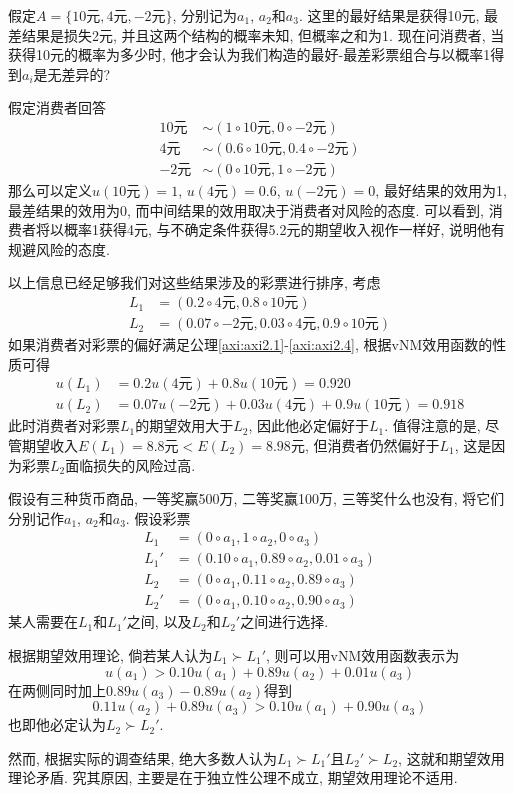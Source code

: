 \documentclass[cn, 12pt, math=mtpro2, bibstyle=apa, blue]{elegantbook}
\begin{document}
\begin{example}\label{exp:exp2.1}
假定$A=\{10\text{元},4\text{元},-2\text{元}\}$, 分别记为$a_1$, $a_2$和$a_3$. 这里的最好结果是获得10元, 最差结果是损失2元, 并且这两个结构的概率未知, 但概率之和为1. 现在问消费者, 当获得10元的概率为多少时, 他才会认为我们构造的最好-最差彩票组合与以概率1得到$a_i$是无差异的?

假定消费者回答
\begin{align*}
10\text{元}&\sim (1\circ 10\text{元}, 0\circ -2\text{元}) \\
4\text{元}&\sim (0.6\circ 10\text{元}, 0.4\circ -2\text{元}) \\
-2\text{元}&\sim (0\circ 10\text{元}, 1\circ -2\text{元})
\end{align*}
那么可以定义$u(10\text{元})=1$, $u(4\text{元})=0.6$, $u(-2\text{元})=0$, 最好结果的效用为1, 最差结果的效用为0, 而中间结果的效用取决于消费者对风险的态度. 可以看到, 消费者将以概率1获得4元, 与不确定条件获得5.2元的期望收入视作一样好, 说明他有规避风险的态度.

以上信息已经足够我们对这些结果涉及的彩票进行排序, 考虑
\begin{align*}
L_1&=(0.2\circ 4\text{元}, 0.8\circ 10\text{元}) \\
L_2&=(0.07\circ -2\text{元}, 0.03\circ 4\text{元}, 0.9\circ 10\text{元})
\end{align*}
如果消费者对彩票的偏好满足公理\ref{axi:axi2.1}-\ref{axi:axi2.4}, 根据vNM效用函数的性质可得
\begin{align*}
u(L_1)&=0.2u(4\text{元})+0.8u(10\text{元})=0.920 \\
u(L_2)&=0.07u(-2\text{元})+0.03u(4\text{元})+0.9u(10\text{元})=0.918
\end{align*}
此时消费者对彩票$L_1$的期望效用大于$L_2$, 因此他必定偏好于$L_1$. 值得注意的是, 尽管期望收入$E(L_1)=8.8\text{元}<E(L_2)=8.98\text{元}$, 但消费者仍然偏好于$L_1$, 这是因为彩票$L_2$面临损失的风险过高.
\end{example}

\begin{example}[$\,$Allais悖论]
假设有三种货币商品, 一等奖赢500万, 二等奖赢100万, 三等奖什么也没有, 将它们分别记作$a_1$, $a_2$和$a_3$. 假设彩票
\begin{align*}
L_1&=(0\circ a_1, 1\circ a_2, 0\circ a_3) \\
L_1'&=(0.10\circ a_1,0.89\circ a_2, 0.01\circ a_3) \\
L_2&=(0\circ a_1, 0.11\circ a_2, 0.89\circ a_3) \\
L_2'&=(0\circ a_1, 0.10\circ a_2, 0.90\circ a_3)
\end{align*}
某人需要在$L_1$和$L_1'$之间, 以及$L_2$和$L_2'$之间进行选择.

根据期望效用理论, 倘若某人认为$L_1\succ L_1'$, 则可以用vNM效用函数表示为
$$u(a_1)>0.10u(a_1)+0.89u(a_2)+0.01u(a_3)$$
在两侧同时加上$0.89u(a_3)-0.89u(a_2)$得到
$$0.11u(a_2)+0.89u(a_3)>0.10u(a_1)+0.90u(a_3)$$
也即他必定认为$L_2\succ L_2'$.

然而, 根据实际的调查结果, 绝大多数人认为$L_1\succ L_1'$且$L_2'\succ L_2$, 这就和期望效用理论矛盾. 究其原因, 主要是在于独立性公理不成立, 期望效用理论不适用.

\end{example}
\end{document}

